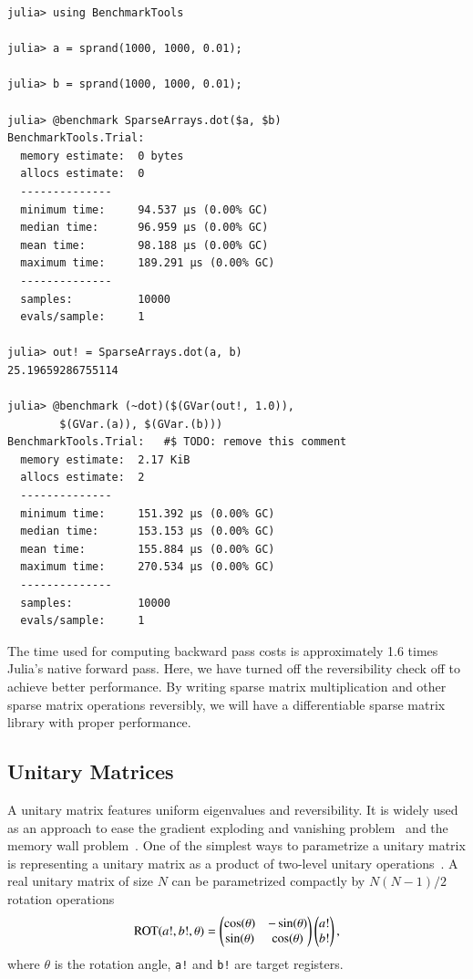 \documentclass[aps,twocolumn,longbibliography,english,superscriptaddress]{revtex4-1}
\newcommand{\<}{\langle}
\renewcommand{\>}{\rangle}
\theoremstyle{definition}\newtheorem{definition}{\textit{Definition}}
\begin{document}
\begin{minipage}{.44\textwidth}
\begin{lstlisting}
julia> using BenchmarkTools

julia> a = sprand(1000, 1000, 0.01);

julia> b = sprand(1000, 1000, 0.01);

julia> @benchmark SparseArrays.dot($a, $b)
BenchmarkTools.Trial: 
  memory estimate:  0 bytes
  allocs estimate:  0
  --------------
  minimum time:     94.537 μs (0.00% GC)
  median time:      96.959 μs (0.00% GC)
  mean time:        98.188 μs (0.00% GC)
  maximum time:     189.291 μs (0.00% GC)
  --------------
  samples:          10000
  evals/sample:     1

julia> out! = SparseArrays.dot(a, b)
25.19659286755114

julia> @benchmark (~dot)($(GVar(out!, 1.0)),
        $(GVar.(a)), $(GVar.(b)))
BenchmarkTools.Trial:   #$ TODO: remove this comment
  memory estimate:  2.17 KiB
  allocs estimate:  2
  --------------
  minimum time:     151.392 μs (0.00% GC)
  median time:      153.153 μs (0.00% GC)
  mean time:        155.884 μs (0.00% GC)
  maximum time:     270.534 μs (0.00% GC)
  --------------
  samples:          10000
  evals/sample:     1
\end{lstlisting}
\end{minipage}

The time used for computing backward pass costs is approximately 1.6 times Julia's native forward pass.
Here, we have turned off the reversibility check off to achieve better performance.
By writing sparse matrix multiplication and other sparse matrix operations reversibly,
we will have a differentiable sparse matrix library with proper performance.

\subsection{Unitary Matrices}\label{sec:umm}
A unitary matrix features uniform eigenvalues and reversibility. It is widely used as an approach to ease the gradient exploding and vanishing problem~\cite{Arjovsky2015,Wisdom2016,Li2016} and the memory wall problem~\cite{Luo2019}.
One of the simplest ways to parametrize a unitary matrix is representing a unitary matrix as a product of two-level unitary operations~\cite{Li2016}. A real unitary matrix of size $N$ can be parametrized compactly by $N(N-1)/2$ rotation operations~\cite{Li2013}
\begin{align}
    {\rm ROT}(a!, b!, \theta)  = \left(\begin{matrix}
        \cos(\theta) & - \sin(\theta)\\
        \sin(\theta)  & \cos(\theta)
    \end{matrix}\right)
    \left(\begin{matrix}
        a!\\
        b!
    \end{matrix}\right),
\end{align}
where \texttt{$\theta$} is the rotation angle, \texttt{a!} and \texttt{b!} are target registers.
\end{document}
